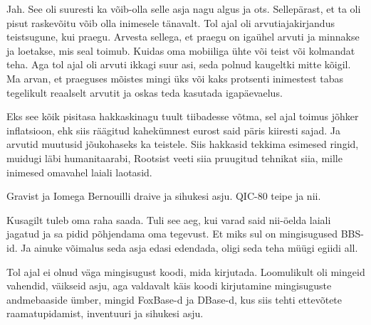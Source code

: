 
Jah. See oli suuresti ka võib-olla selle asja nagu algus ja ots. Sellepärast, 
et ta oli pisut raskevõitu võib olla inimesele tänavalt. Tol ajal oli 
arvutiajakirjandus  teistsugune, kui praegu. Arvesta sellega, et praegu on 
igaühel arvuti ja minnakse ja loetakse, mis seal toimub. Kuidas oma mobiiliga 
ühte või teist või kolmandat teha. Aga tol ajal oli arvuti ikkagi suur asi, 
seda polnud kaugeltki mitte kõigil. Ma arvan, et praeguses mõistes mingi üks 
või kaks protsenti inimestest tabas tegelikult reaalselt arvutit ja oskas teda 
kasutada igapäevaelus.
                 

Eks see kõik pisitasa hakkaskinagu tuult tiibadesse võtma, sel ajal toimus 
jõhker inflatsioon, ehk siis räägitud kahekümnest eurost said päris kiiresti 
sajad. Ja arvutid muutusid jõukohaseks ka teistele. Siis hakkasid tekkima 
esimesed ringid, muidugi läbi humanitaarabi, Rootsist veeti siia pruugitud 
tehnikat siia, mille inimesed omavahel laiali laotasid.


Gravist ja Iomega Bernouilli draive ja sihukesi asju. QIC-80 
teipe ja nii.


Kusagilt tuleb oma raha saada. Tuli see aeg, kui varad said nii-öelda laiali 
jagatud ja sa pidid põhjendama oma tegevust. Et miks sul on mingisugused 
BBS-id. Ja ainuke võimalus seda asja edasi edendada, oligi seda teha müügi 
egiidi all.

                 
Tol ajal ei olnud väga mingisugust koodi, mida kirjutada. Loomulikult oli 
mingeid vahendid, väikseid asju, aga valdavalt käis koodi kirjutamine 
mingisuguste andmebaaside ümber, mingid FoxBase-d ja DBase-d, kus siis tehti 
ettevõtete  raamatupidamist,  inventuuri ja sihukesi asju. 

